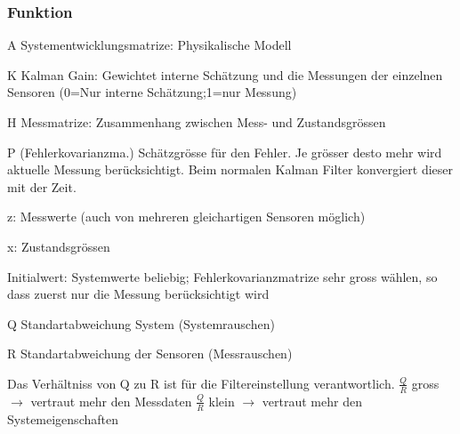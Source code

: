 \begin{minipage}{11cm}
	\small
	\subsubsection{Funktion}
		\begin{liste}
	    	\item A Systementwicklungsmatrize: Physikalische Modell
	    	\item K Kalman Gain: Gewichtet interne Schätzung und die Messungen der
	    	einzelnen Sensoren (0=Nur interne Schätzung;1=nur Messung)
	    	\item H Messmatrize: Zusammenhang zwischen Mess- und Zustandsgrössen
	    	\item P (Fehlerkovarianzma.) Schätzgrösse für den Fehler. Je grösser desto
	    	mehr wird aktuelle Messung berücksichtigt. Beim normalen Kalman Filter
	    	konvergiert dieser mit der Zeit.
	    	\item z: Messwerte (auch von mehreren gleichartigen Sensoren möglich)
	    	\item x: Zustandsgrössen
	    	\item Initialwert: Systemwerte beliebig; Fehlerkovarianzmatrize sehr
	    	gross wählen, so dass zuerst nur die Messung berücksichtigt wird
	    	\item Q Standartabweichung System (Systemrauschen)
	    	\item R Standartabweichung der Sensoren (Messrauschen)
				\item Das Verhältniss von Q zu R ist für die Filtereinstellung verantwortlich.\newline
				$\frac QR$ gross $\rightarrow$ vertraut mehr den Messdaten\newline \hspace{4cm} $\frac QR$ klein $\rightarrow$ vertraut mehr den Systemeigenschaften
	    \end{liste}
	\normalsize
\end{minipage}\\
\clearpage

